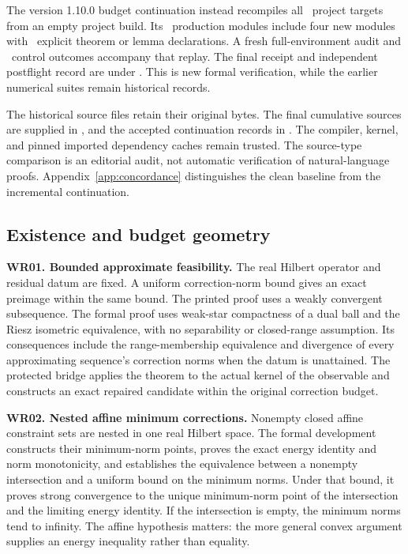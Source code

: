 The version 1.10.0 budget continuation instead recompiles all \EditionBudgetTargets\ project targets from an empty project build. Its \EditionBudgetModules\ production modules include four new modules with \EditionBudgetNewTheorems\ explicit theorem or lemma declarations. A fresh full-environment audit and \EditionBudgetControls\ control outcomes accompany that replay. The final receipt and independent postflight record are under . This is new formal verification, while the earlier numerical suites remain historical records.

The historical source files retain their original bytes. The final cumulative sources are supplied in , and the accepted continuation records in . The compiler, kernel, and pinned imported dependency caches remain trusted. The source-type comparison is an editorial audit, not automatic verification of natural-language proofs. Appendix~\ref{app:concordance} distinguishes the clean baseline from the incremental continuation.

\subsection{Existence and budget geometry}
\textbf{WR01. Bounded approximate feasibility.} The real Hilbert operator and residual datum are fixed. A uniform correction-norm bound gives an exact preimage within the same bound. The printed proof uses a weakly convergent subsequence. The formal proof uses weak-star compactness of a dual ball and the Riesz isometric equivalence, with no separability or closed-range assumption. Its consequences include the range-membership equivalence and divergence of every approximating sequence's correction norms when the datum is unattained. The protected bridge applies the theorem to the actual kernel of the observable and constructs an exact repaired candidate within the original correction budget.

\textbf{WR02. Nested affine minimum corrections.} Nonempty closed affine constraint sets are nested in one real Hilbert space. The formal development constructs their minimum-norm points, proves the exact energy identity and norm monotonicity, and establishes the equivalence between a nonempty intersection and a uniform bound on the minimum norms. Under that bound, it proves strong convergence to the unique minimum-norm point of the intersection and the limiting energy identity. If the intersection is empty, the minimum norms tend to infinity. The affine hypothesis matters: the more general convex argument supplies an energy inequality rather than equality.

